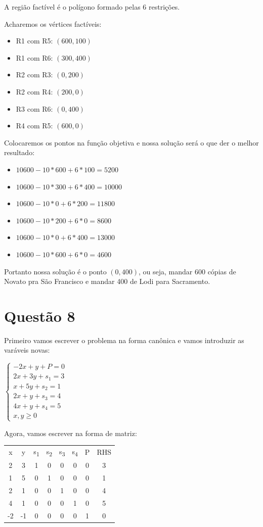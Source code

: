 \documentclass[11pt]{article}
\begin{document}
A região factível é o polígono formado pelas 6 restrições.

Acharemos os vértices factíveis:
\begin{itemize}
\item R1 com R5: \((600, 100)\)
\item R1 com R6: \((300, 400)\)
\item R2 com R3: \((0, 200)\)
\item R2 com R4: \((200, 0)\)
\item R3 com R6: \((0, 400)\)
\item R4 com R5: \((600, 0)\)
\end{itemize}

Colocaremos os pontos na função objetiva e nossa solução será o que der o melhor resultado:
\begin{itemize}
\item \(10600 - 10*600 + 6*100 = 5200\)
\item \(10600 - 10*300 + 6*400 = 10000\)
\item \(10600 - 10*0 + 6*200 = 11800\)
\item \(10600 - 10*200 + 6*0 = 8600\)
\item \(10600 - 10*0 + 6*400 = 13000\)
\item \(10600 - 10*600 + 6*0 = 4600\)
\end{itemize}


Portanto nossa solução é o ponto \((0, 400)\), ou seja, mandar 600 cópias de Novato pra São Francisco e mandar 400 de Lodi
para Sacramento.
\section{Questão 8}
\label{sec:orgaa6d782}
Primeiro vamos escrever o problema na forma canônica e vamos introduzir as varáveis novas:

\(\begin{cases}
  -2x+y+P = 0 \\
  2x+3y+s_1 = 3 \\
  x+5y+s_2 = 1 \\
  2x+y+s_3 = 4 \\
  4x+y+s_4 = 5 \\
  x,y \geq 0
  \end{cases}\)

Agora, vamos escrever na forma de matriz:

\begin{center}
\begin{tabular}{c c c c c c c | c}
x & y & s\textsubscript{1} & s\textsubscript{2} & s\textsubscript{3} & s\textsubscript{4} & P & RHS\\
2 & 3 & 1 & 0 & 0 & 0 & 0 & 3\\
1 & 5 & 0 & 1 & 0 & 0 & 0 & 1\\
2 & 1 & 0 & 0 & 1 & 0 & 0 & 4\\
4 & 1 & 0 & 0 & 0 & 1 & 0 & 5\\
\hline
-2 & -1 & 0 & 0 & 0 & 0 & 1 & 0\\
\end{tabular}
\end{center}
\end{document}

